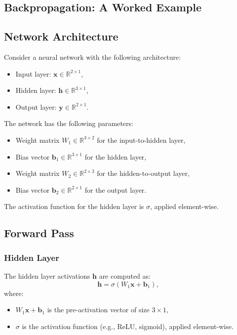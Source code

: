 \begin{notechapter}
\chapter{Backpropagation: A Worked Example}\label{ch:backprop-worked-example}

\section{Network Architecture}

Consider a neural network with the following architecture:
\begin{itemize}
    \item Input layer: \( \mathbf{x} \in \mathbb{R}^{2 \times 1} \),
    \item Hidden layer: \( \mathbf{h} \in \mathbb{R}^{3 \times 1} \),
    \item Output layer: \( \mathbf{y} \in \mathbb{R}^{2 \times 1} \).
\end{itemize}

The network has the following parameters:
\begin{itemize}
    \item Weight matrix \( W_1 \in \mathbb{R}^{3 \times 2} \) for the 
          input-to-hidden layer,
    \item Bias vector \( \mathbf{b}_1 \in \mathbb{R}^{3 \times 1} \) 
          for the hidden layer,
    \item Weight matrix \( W_2 \in \mathbb{R}^{2 \times 3} \) for the 
          hidden-to-output layer,
    \item Bias vector \( \mathbf{b}_2 \in \mathbb{R}^{2 \times 1} \) 
          for the output layer.
\end{itemize}

The activation function for the hidden layer is \( \sigma \), 
applied element-wise.

\section{Forward Pass}

\subsection{Hidden Layer}

The hidden layer activations \( \mathbf{h} \) are computed as:
\[
\mathbf{h} = \sigma(W_1 \mathbf{x} + \mathbf{b}_1),
\]
where:
\begin{itemize}
    \item \( W_1 \mathbf{x} + \mathbf{b}_1 \) is the pre-activation 
          vector of size \( 3 \times 1 \),
    \item \( \sigma \) is the activation function (e.g., ReLU, sigmoid), 
          applied element-wise.
\end{itemize}


\end{notechapter}
